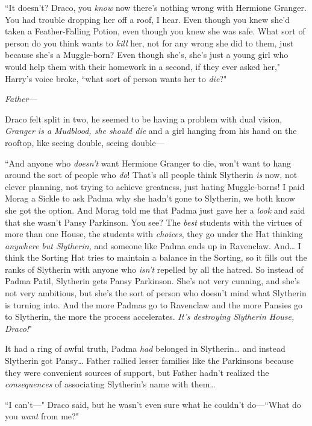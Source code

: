``It doesn't? Draco, you \emph{know} now there's nothing wrong with Hermione Granger. You had trouble dropping her off a roof, I hear. Even though you knew she'd taken a Feather-Falling Potion, even though you knew she was safe. What sort of person do you think wants to \emph{kill} her, not for any wrong she did to them, just because she's a Muggle-born? Even though she's, she's just a young girl who would help them with their homework in a second, if they ever asked her," Harry's voice broke, ``what sort of person wants her to \emph{die}?"

\emph{Father—}

Draco felt split in two, he seemed to be having a problem with dual vision, \emph{Granger is a Mudblood, she should die} and a girl hanging from his hand on the rooftop, like seeing double, seeing double—

``And anyone who \emph{doesn't} want Hermione Granger to die, won't want to hang around the sort of people who \emph{do}! That's all people think Slytherin \emph{is} now, not clever planning, not trying to achieve greatness, just hating Muggle-borns! I paid Morag a Sickle to ask Padma why she hadn't gone to Slytherin, we both know she got the option. And Morag told me that Padma just gave her a \emph{look} and said that she wasn't Pansy Parkinson. You see? The \emph{best} students with the virtues of more than one House, the students with \emph{choices}, they go under the Hat thinking \emph{anywhere but Slytherin,} and someone like Padma ends up in Ravenclaw. And{\ldots} I think the Sorting Hat tries to maintain a balance in the Sorting, so it fills out the ranks of Slytherin with anyone who \emph{isn't} repelled by all the hatred. So instead of Padma Patil, Slytherin gets Pansy Parkinson. She's not very cunning, and she's not very ambitious, but she's the sort of person who doesn't mind what Slytherin is turning into. And the more Padmas go to Ravenclaw and the more Pansies go to Slytherin, the more the process accelerates. \emph{It's destroying Slytherin House, Draco!}"

It had a ring of awful truth, Padma \emph{had} belonged in Slytherin{\ldots} and instead Slytherin got Pansy{\ldots} Father rallied lesser families like the Parkinsons because they were convenient sources of support, but Father hadn't realized the \emph{consequences} of associating Slytherin's name with them{\ldots}

``I can't—" Draco said, but he wasn't even sure what he couldn't do—``What do you \emph{want} from me?"

